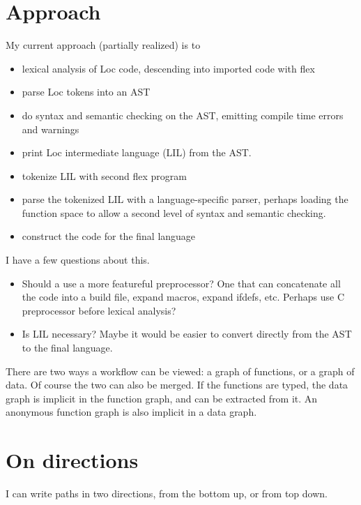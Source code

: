 \documentclass[12pt]{article}
\begin{document}
\section{Approach}

My current approach (partially realized) is to

\begin{itemize}
 \item lexical analysis of Loc code, descending into imported code with flex
 \item parse Loc tokens into an AST
 \item do syntax and semantic checking on the AST, emitting compile time errors
    and warnings 
 \item print Loc intermediate language (LIL) from the AST.
 \item tokenize LIL with second flex program
 \item parse the tokenized LIL with a language-specific parser, perhaps loading
    the function space to allow a second level of syntax and semantic checking.
 \item construct the code for the final language
\end{itemize}

I have a few questions about this.

\begin{itemize}
 \item Should a use a more featureful preprocessor? One that can concatenate all
    the code into a build file, expand macros, expand ifdefs, etc. Perhaps use
    C preprocessor before lexical analysis?

 \item Is LIL necessary? Maybe it would be easier to convert directly from the AST
    to the final language.
\end{itemize}

There are two ways a workflow can be viewed: a graph of functions, or a graph
of data. Of course the two can also be merged. If the functions are typed, the
data graph is implicit in the function graph, and can be extracted from it. An
anonymous function graph is also implicit in a data graph.

\section{On directions}

I can write paths in two directions, from the bottom up, or from top down.
\end{document}
